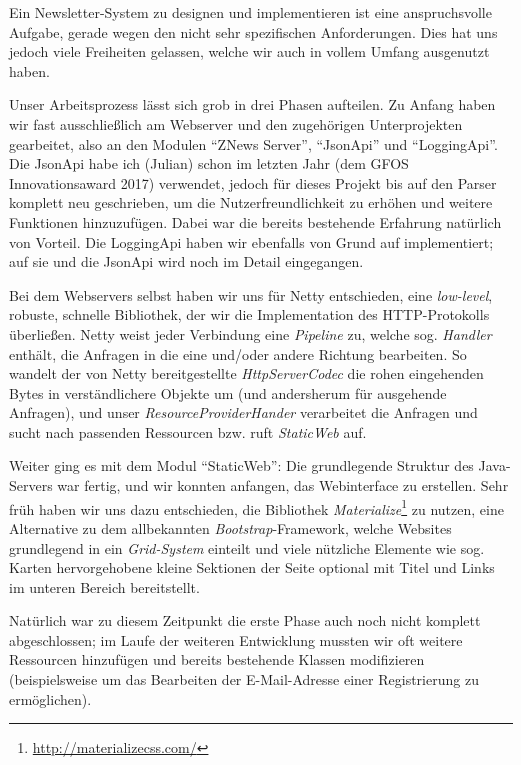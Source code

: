 Ein Newsletter-System zu designen und implementieren ist
eine anspruchsvolle Aufgabe,
gerade wegen den nicht sehr spezifischen Anforderungen.
Dies hat uns jedoch viele Freiheiten gelassen,
welche wir auch in vollem Umfang ausgenutzt haben.

Unser Arbeitsprozess lässt sich grob in drei Phasen aufteilen.
Zu Anfang haben wir fast ausschließlich am Webserver und den zugehörigen
Unterprojekten gearbeitet,
also an den Modulen ``ZNews Server'', ``JsonApi'' und ``LoggingApi''.
Die JsonApi habe ich (Julian) schon im letzten Jahr
(dem GFOS Innovationsaward 2017) verwendet,
jedoch für dieses Projekt bis auf den Parser komplett neu geschrieben,
um die Nutzerfreundlichkeit zu erhöhen und weitere Funktionen hinzuzufügen.
Dabei war die bereits bestehende Erfahrung natürlich von Vorteil.
Die LoggingApi haben wir ebenfalls von Grund auf implementiert;
auf sie und die JsonApi wird noch im Detail eingegangen.

Bei dem Webservers selbst haben wir uns für Netty entschieden,
eine \emph{low-level}, robuste, schnelle Bibliothek,
der wir die Implementation des HTTP-Protokolls überließen.
Netty weist jeder Verbindung eine \emph{Pipeline} zu,
welche sog. \emph{Handler} enthält,
die Anfragen in die eine und/oder andere Richtung bearbeiten.
So wandelt der von Netty bereitgestellte \emph{HttpServerCodec}
die rohen eingehenden Bytes in verständlichere Objekte um
(und andersherum für ausgehende Anfragen),
und unser \emph{ResourceProviderHander} verarbeitet die Anfragen
und sucht nach passenden Ressourcen bzw. ruft \emph{StaticWeb} auf.

Weiter ging es mit dem Modul ``StaticWeb'':
Die grundlegende Struktur des Java-Servers war fertig,
und wir konnten anfangen,
das Webinterface zu erstellen.
Sehr früh haben wir uns dazu entschieden,
die Bibliothek \emph{Materialize}\footnote{\url{http://materializecss.com/}}
zu nutzen,
eine Alternative zu dem allbekannten \emph{Bootstrap}-Framework,
welche Websites grundlegend in ein \emph{Grid-System} einteilt
und viele nützliche Elemente wie sog. Karten \textemdash{}
hervorgehobene kleine Sektionen der Seite optional mit Titel und Links im unteren Bereich \textemdash{}
bereitstellt.

Natürlich war zu diesem Zeitpunkt die erste Phase auch noch nicht komplett abgeschlossen;
im Laufe der weiteren Entwicklung mussten wir oft weitere Ressourcen hinzufügen
und bereits bestehende Klassen modifizieren
(beispielsweise um das Bearbeiten der E-Mail-Adresse einer Registrierung zu ermöglichen).

